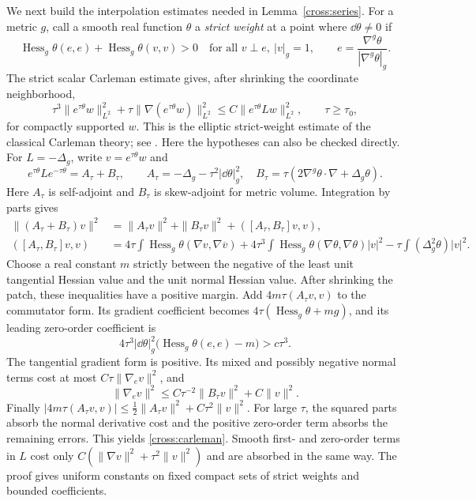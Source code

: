 We next build the interpolation estimates needed in
Lemma~\ref{cross:series}.  For a metric $g$, call a smooth real function
$\theta$ a \emph{strict weight} at a point where $\dd\theta\ne0$ if
\begin{equation}\label{cross:strict-weight}
 \operatorname{Hess}_g\theta(e,e)
  +\operatorname{Hess}_g\theta(v,v)>0
 \quad\text{for all }v\perp e,\ |v|_g=1,
 \qquad e=\frac{\nabla^g\theta}{|\nabla^g\theta|_g}.
\end{equation}
The strict scalar Carleman estimate gives, after shrinking the
coordinate neighborhood,
\begin{equation}\label{cross:carleman}
 \tau^3\|e^{\tau\theta}w\|_{L^2}^2
 +\tau\|\nabla(e^{\tau\theta}w)\|_{L^2}^2
 \le C\|e^{\tau\theta}Lw\|_{L^2}^2,
 \qquad \tau\ge\tau_0,
\end{equation}
for compactly supported $w$.
This is the elliptic strict-weight estimate of the classical
Carleman theory; see
\citet[Definition~8.3 and Theorem~9(a)]{KochTataru2005}.
Here the hypotheses can also be checked directly.  For $L=-\Delta_g$,
write $v=e^{\tau\theta}w$ and
\[
 e^{\tau\theta}Le^{-\tau\theta}=A_\tau+B_\tau,\qquad
 A_\tau=-\Delta_g-\tau^2|\dd\theta|_g^2,\quad
 B_\tau=\tau(2\nabla^g\theta\cdot\nabla+\Delta_g\theta).
\]
Here $A_\tau$ is self-adjoint and $B_\tau$ is skew-adjoint for
metric volume.  Integration by parts gives
\begin{align*}
 \|(A_\tau+B_\tau)v\|^2
 &=\|A_\tau v\|^2+\|B_\tau v\|^2
       +([A_\tau,B_\tau]v,v),\\
 ([A_\tau,B_\tau]v,v)
 &=4\tau\int\operatorname{Hess}_g\theta(\nabla v,\nabla\overline v)
   +4\tau^3\int\operatorname{Hess}_g\theta
                 (\nabla\theta,\nabla\theta)|v|^2
   -\tau\int(\Delta_g^2\theta)|v|^2.
\end{align*}
Choose a real constant $m$ strictly between the negative of the least
unit tangential Hessian value and the unit normal Hessian value.
After shrinking the patch, these inequalities have a positive margin.
Add $4m\tau(A_\tau v,v)$ to the commutator form.  Its gradient
coefficient becomes $4\tau(\operatorname{Hess}_g\theta+mg)$,
and its leading zero-order coefficient is
\[
 4\tau^3|\dd\theta|_g^2
       \big(\operatorname{Hess}_g\theta(e,e)-m\big)>c\tau^3.
\]
The tangential gradient form is positive.  Its mixed and possibly
negative normal terms cost at most
$C\tau\|\nabla_e v\|^2$, and
\[
 \|\nabla_e v\|^2
 \le C\tau^{-2}\|B_\tau v\|^2+C\|v\|^2.
\]
Finally
$|4m\tau(A_\tau v,v)|\le\tfrac12\|A_\tau v\|^2+
C\tau^2\|v\|^2$.
For large $\tau$, the squared parts absorb the normal derivative
cost and the positive zero-order term absorbs the remaining errors.
This yields \eqref{cross:carleman}.  Smooth first- and zero-order terms
in $L$ cost only $C(\|\nabla v\|^2+\tau^2\|v\|^2)$ and are absorbed
in the same way.  The proof gives uniform constants on fixed compact
sets of strict weights and bounded coefficients.

